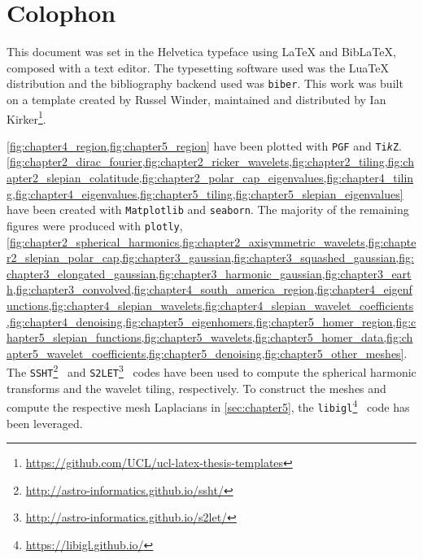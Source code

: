 \appendix

\chapter{Colophon}\label{sec:appendix}

This document was set in the Helvetica typeface using \LaTeX{} and Bib\LaTeX{}, composed with a text editor.
The typesetting software used was the Lua\TeX{} distribution and the bibliography backend used was \texttt{biber}.
This work was built on a template created by Russel Winder, maintained and distributed by Ian Kirker\footnote{\url{https://github.com/UCL/ucl-latex-thesis-templates}}.

\cref{fig:chapter4_region,fig:chapter5_region} have been plotted with \texttt{PGF} and \texttt{Ti\emph{k}Z}.
\cref{fig:chapter2_dirac_fourier,fig:chapter2_ricker_wavelets,fig:chapter2_tiling,fig:chapter2_slepian_colatitude,fig:chapter2_polar_cap_eigenvalues,fig:chapter4_tiling,fig:chapter4_eigenvalues,fig:chapter5_tiling,fig:chapter5_slepian_eigenvalues} have been created with \texttt{Matplotlib} and \texttt{seaborn}.
The majority of the remaining figures were produced with \texttt{plotly}, \ie{} \cref{fig:chapter2_spherical_harmonics,fig:chapter2_axisymmetric_wavelets,fig:chapter2_slepian_polar_cap,fig:chapter3_gaussian,fig:chapter3_squashed_gaussian,fig:chapter3_elongated_gaussian,fig:chapter3_harmonic_gaussian,fig:chapter3_earth,fig:chapter3_convolved,fig:chapter4_south_america_region,fig:chapter4_eigenfunctions,fig:chapter4_slepian_wavelets,fig:chapter4_slepian_wavelet_coefficients,fig:chapter4_denoising,fig:chapter5_eigenhomers,fig:chapter5_homer_region,fig:chapter5_slepian_functions,fig:chapter5_wavelets,fig:chapter5_homer_data,fig:chapter5_wavelet_coefficients,fig:chapter5_denoising,fig:chapter5_other_meshes}.
The \texttt{SSHT}\footnote{\url{http://astro-informatics.github.io/ssht/}}~\cite{McEwen2011} and \texttt{S2LET}\footnote{\url{http://astro-informatics.github.io/s2let/}}~\cite{Leistedt2013} codes have been used to compute the spherical harmonic transforms and the wavelet tiling, respectively.
To construct the meshes and compute the respective mesh Laplacians in \cref{sec:chapter5}, the \texttt{libigl}\footnote{\url{https://libigl.github.io/}}~\cite{Libigl2018} code has been leveraged.


